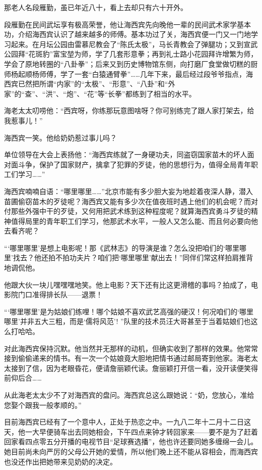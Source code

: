 \par 那老人名段雁勤，虽已年近八十，看上去却只有六十开外。
\par 段雁勤在民间武坛享有极高荣誉，他让海西宾先向晚他一辈的民间武术家学基本功，介绍海西宾认识了越来越多的师傅。基本功过了关，海西宾便一门又一门地学习起来。在月坛公园由雷慕尼教会了“陈氏太极”，马长青教会了弹腿功；又到宣武公园拜“花斑豹”富宝堃为师，学了几套形意拳；再到礼士路小花园拜许增繁为师，学会了原地转圈的“八卦拳”；后来又到历史博物馆东侧，向打磨厂食堂做切糕的厨师杨起顺杨师傅，学了一套“白猿通臂拳”……几年下来，最后经过段爷爷指点，海西宾已然把所谓“内家”的“太极”、“形意”、“八卦”和“外家”的“查”、“洪”、“炮”、“花”等“长拳”都练到了相当的水平。
\par 海老太太叨唠他：“西宾呀，你练那玩意图啥呀？你可别练完了跟人家打架去，给我惹事儿！”
\par 海西宾一笑。他给奶奶惹过事儿吗？
\par 单位领导在大会上表扬他：“海西宾练就了一身硬功夫，同盗窃国家苗木的坏人面对面斗争，保护了国家财产，擒拿了犯罪的歹徒，他的思想行为，值得全局青年职工们学习……”
\par 海西宾喃喃自语：“哪里哪里……”北京市能有多少胆大妄为地趁着夜深人静，潜入苗圃偷窃苗木的歹徒呢？海西宾又能有多少次在值夜班时遇上他们的机会呢？而对付那些外强中干的歹徒，又何用把武术练到这种程度呢？就算海西宾勇斗歹徒的精神值得局里的青年职工们学习，他那武术水平，一般人又怎么能、而且何必要向他去看齐呢？
\par “‘哪里哪里’是想上电影呢！那《武林志》的导演是谁？怎么没把咱们的‘哪里哪里’找去？他还拍不拍功夫片？咱们把‘哪里哪里’献出去！”同伴们常这样拍肩推背地调侃他。
\par 他跟大伙一块儿嘿嘿嘿地笑。他上电影？天下还有比这更滑稽的事吗？拍成了，电影院门口准得排长队——退票！
\par “‘哪里哪里’是为姑娘们练哩！哪个姑娘不喜欢武艺高强的硬汉！何况咱们的‘哪里哪里’并非五大三粗，而是‘儒将风范’! ”队里的技术员汪大哥甚至于当着姑娘们也这么打哈哈。
\par 对此海西宾保持沉默。他当然并无那样的动机，但确实收到了那样的效果。他常常接到偷偷递来的情书。有一次一个姑娘竟大胆地把情书通过邮局寄到他家。海老太太接到了信，因为老眼昏花，便请詹丽颖代读。詹丽颖打开信一看，没开读便笑得前仰后合……
\par 从此海老太太少不了对海西宾的盘问。海西宾总这么跟她说：“奶，您放心，准给您娶个跟我一般孝顺的。”
\par 目前海西宾已经有了一个意中人，正处于热恋之中。一九八二年十二月十二日这天，他一大早便骑车出去同她相会，下午四点来钟才转回家来——要不是为了赶着回家看四点零五分开播的电视节目“足球赛选播”，他也许还要同她多缠绵一会儿。她目前尚未向严厉的父母公开她的爱情，所以他们晚上还不能从容相会，而海西宾也没还作出把她带来见奶奶的决定。

